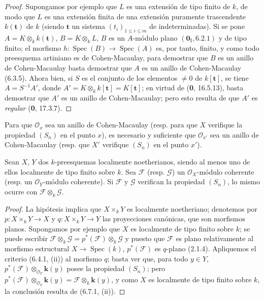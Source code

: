 \begin{proof}
Supongamos por ejemplo que $L$ es una extensión de tipo finito de $k$,
de modo que $L$ es una extensión finita de una extensión puramente
trascendente $k(\mathbf t)$ de $k$ (siendo $\mathbf t$ un sistema
$(t_i)_{1\leqslant i\leqslant m}$ de indeterminadas). Si se pone
$A=K\otimes_k k(\mathbf t)$, $B=K\otimes_k L$, $B$ es un $A$-módulo
plano $(\mathbf{0}_{\mathrm I},6.2.1)$ y de tipo finito; el morfismo
$h:\operatorname{Spec}(B)\to\operatorname{Spec}(A)$ es, por tanto, finito,
y como todo preesquema artiniano es de Cohen-Macaulay, para demostrar que
$B$ es un anillo de Cohen-Macaulay basta demostrar que $A$ es un anillo de
Cohen-Macaulay (6.3.5). Ahora bien, si $S$ es el conjunto de los elementos
$\neq 0$ de $k[\mathbf t]$, se tiene $A=S^{-1}A'$, donde
$A'=K\otimes_k k[\mathbf t]=K[\mathbf t]$; en virtud de
(\textbf 0, 16.5.13), basta demostrar que $A'$ es un anillo de Cohen-Macaulay; pero
esto resulta de que $A'$ es \emph{regular} (\textbf 0, 17.3.7).
\end{proof}

\begin{corollary}[6.7.2]
Para que $\mathcal O_x$ sea un anillo de Cohen-Macaulay \textup{(resp.} para
que $X$ verifique la propiedad $(S_n)$ en el punto $x$), es necesario y
suficiente que $\mathcal O_{x'}$ sea un anillo de Cohen-Macaulay \textup{(resp.} que
$X'$ verifique $(S_n)$ en el punto $x'$).
\end{corollary}

\begin{corollary}[6.7.3]
\label{IV.2.s6.7.3-fr}
Sean $X$, $Y$ dos $k$-preesquemas localmente noetherianos, siendo al menos
uno de ellos localmente de tipo finito sobre $k$. Sea $\mathscr F$ \textup{(resp.}
$\mathscr G$) un $\mathcal O_X$-módulo coherente \textup{(resp.} un
$\mathcal O_Y$-módulo coherente). Si $\mathscr F$ y $\mathscr G$
verifican la propiedad $(S_n)$, lo mismo ocurre con
$\mathscr F\otimes_k\mathscr G$.
\end{corollary}

\begin{proof}
La hipótesis implica que $X\times_kY$ es localmente noetheriano; denotemos
por $p:X\times_kY\to X$ y $q:X\times_kY\to Y$ las proyecciones canónicas,
que son morfismos planos. Supongamos por ejemplo que $X$ es localmente de
tipo finito sobre $k$; se puede escribir
$\mathscr F\otimes_k\mathscr G=p^*(\mathscr F)\otimes_k\mathscr G$
y puesto que $\mathscr F$ es plano relativamente al morfismo estructural
$X\to\operatorname{Spec}(k)$, $p^*(\mathscr F)$ es $q$-plano (2.1.4).
Apliquemos el criterio (6.4.1, (ii)) al morfismo $q$; basta ver que, para
todo $y\in Y$, $p^*(\mathscr F)\otimes_{\mathcal O_Y}\boldsymbol{k}(y)$ posee la
propiedad $(S_n)$; pero
$p^*(\mathscr F)\otimes_{\mathcal O_Y}\boldsymbol{k}(y)=\mathscr F\otimes_k \boldsymbol{k}(y)$,
y como $X$ es localmente de tipo finito sobre $k$, la conclusión resulta
de (6.7.1, (ii)).
\end{proof}
